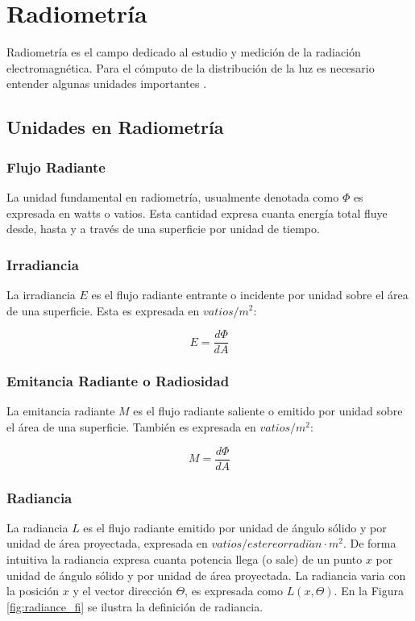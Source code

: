 \section{Radiometría}
Radiometría es el campo dedicado al estudio y medición de la radiación electromagnética. Para el cómputo de la distribución de la luz es necesario entender algunas unidades importantes \cite{advanced_gi2006}.

\subsection{Unidades en Radiometría}

\subsubsection{Flujo Radiante}
La unidad fundamental en radiometría, usualmente denotada como $\Phi$ es expresada en watts o vatios. Esta cantidad expresa cuanta energía total fluye desde, hasta y a través de una superficie por unidad de tiempo.
\subsubsection{Irradiancia}
\label{subsubsec:irradiance}
La irradiancia $E$ es el flujo radiante entrante o incidente por unidad sobre el área de una superficie. Esta es expresada en $vatios/m^2$:

\begin{equation}
    E = \frac{d\Phi}{dA}
	\label{eq:irradiance_eq}
\end{equation}

\subsubsection{Emitancia Radiante o Radiosidad}
La emitancia radiante $M$ es el flujo radiante saliente o emitido por unidad sobre el área de una superficie. También es expresada en $vatios/m^2$:

\begin{equation}
    M = \frac{d\Phi}{dA}
	\label{eq:radiosity_eq}
\end{equation}

\subsubsection{Radiancia}
La radiancia $L$ es el flujo radiante emitido por unidad de ángulo sólido y por unidad de área proyectada, expresada en $vatios/estereorradi\acute{a}n\cdot m^2$. De forma intuitiva la radiancia expresa cuanta potencia llega (o sale) de un punto $x$ por unidad de ángulo sólido y por unidad de área proyectada. La radiancia varia con la posición $x$ y el vector dirección $\Theta$, es expresada como $L(x,\Theta)$. En la Figura \ref{fig:radiance_fi} se ilustra la definición de radiancia.

